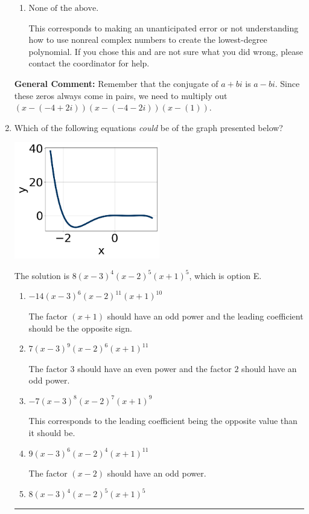 \documentclass{extbook}[14pt]
\newcommand{\litem}[1]{\item #1

\rule{\textwidth}{0.4pt}}
\begin{document}
\begin{enumerate}
{\begin{enumerate}[label=\Alph*.]
* $x^{3} +7 x^{2} +12 x -20$, which is the correct option.
\item \( \text{None of the above.} \)

This corresponds to making an unanticipated error or not understanding how to use nonreal complex numbers to create the lowest-degree polynomial. If you chose this and are not sure what you did wrong, please contact the coordinator for help.
\end{enumerate}

\textbf{General Comment:} Remember that the conjugate of $a+bi$ is $a-bi$. Since these zeros always come in pairs, we need to multiply out $(x-(-4 + 2 i))(x-(-4 - 2 i))(x-(1))$.
}
\litem{
Which of the following equations \textit{could} be of the graph presented below?

\begin{center}
    \includegraphics[width=0.5\textwidth]{../Figures/polyGraphToFunctionCopyA.png}
\end{center}


The solution is \( 8(x - 3)^{4} (x - 2)^{5} (x + 1)^{5} \), which is option E.\begin{enumerate}[label=\Alph*.]
\item \( -14(x - 3)^{6} (x - 2)^{11} (x + 1)^{10} \)

The factor $(x + 1)$ should have an odd power and the leading coefficient should be the opposite sign.
\item \( 7(x - 3)^{9} (x - 2)^{6} (x + 1)^{11} \)

The factor $3$ should have an even power and the factor $2$ should have an odd power.
\item \( -7(x - 3)^{8} (x - 2)^{7} (x + 1)^{9} \)

This corresponds to the leading coefficient being the opposite value than it should be.
\item \( 9(x - 3)^{6} (x - 2)^{4} (x + 1)^{11} \)

The factor $(x - 2)$ should have an odd power.
\item \( 8(x - 3)^{4} (x - 2)^{5} (x + 1)^{5} \)


\end{enumerate}}
\end{enumerate}
\end{document}
